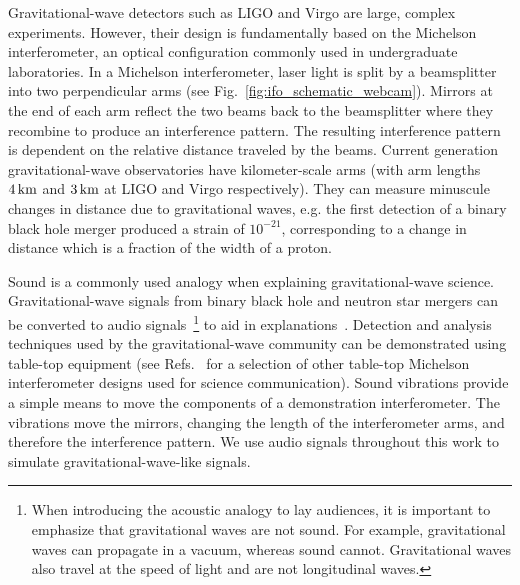 \documentclass[paper-main.tex]{subfiles}
\begin{document}
Gravitational-wave detectors such as LIGO and Virgo are large, complex experiments. 
However, their design is fundamentally based on the Michelson interferometer, an optical configuration commonly used in undergraduate laboratories. 
In a Michelson interferometer, laser light is split by a beamsplitter into two perpendicular arms (see Fig.~\ref{fig:ifo_schematic_webcam}). 
Mirrors at the end of each arm reflect the two beams back to the beamsplitter where they recombine to produce an interference pattern.
The resulting interference pattern is dependent on the relative distance traveled by the beams. 
Current generation gravitational-wave observatories have kilometer-scale arms (with arm lengths $4\,{\rm km}$ and $3\,{\rm km}$ at LIGO and Virgo respectively). 
They can measure minuscule changes in distance due to gravitational waves, e.g. the first detection of a binary black hole merger produced a strain of $10^{-21}$, corresponding to a change in distance which is a fraction of the width of a proton. 



Sound is a commonly used analogy when explaining gravitational-wave science. 
Gravitational-wave signals from binary black hole and neutron star mergers can be converted to audio signals~\footnote{When introducing the acoustic analogy to lay audiences, it is important to emphasize that gravitational waves are not sound. For example, gravitational waves can propagate in a vacuum, whereas sound cannot. Gravitational waves also travel at the speed of light and are not longitudinal waves.} to aid in explanations~\cite{SoundsOfSpaceTime:online,BlackHoleHunter:online}.
Detection and analysis techniques used by the gravitational-wave community can be demonstrated using table-top equipment (see Refs.~\cite{TTExhibit:2020,TTExhibit:online,AMIGO:online,ThorLabsIFO,LIGOIFOGlue,LIGOIFOMagnets,FoxEtAl:1999} for a selection of other table-top Michelson interferometer designs used for science communication).
Sound vibrations provide a simple means to move the components of a demonstration interferometer. 
The vibrations move the mirrors, changing the length of the interferometer arms, and therefore the interference pattern.
We use audio signals throughout this work to simulate gravitational-wave-like signals.
\end{document}
